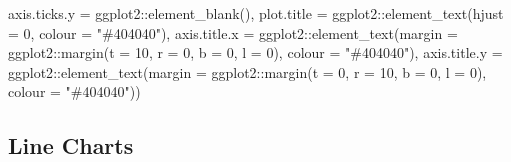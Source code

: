 \documentclass[
]{book}
\newenvironment{Shaded}{\begin{snugshade}}{\end{snugshade}}
\newcommand{\AttributeTok}[1]{\textcolor[rgb]{0.77,0.63,0.00}{#1}}
\newcommand{\DecValTok}[1]{\textcolor[rgb]{0.00,0.00,0.81}{#1}}
\newcommand{\FunctionTok}[1]{\textcolor[rgb]{0.00,0.00,0.00}{#1}}
\newcommand{\NormalTok}[1]{#1}
\newcommand{\SpecialCharTok}[1]{\textcolor[rgb]{0.00,0.00,0.00}{#1}}
\newcommand{\StringTok}[1]{\textcolor[rgb]{0.31,0.60,0.02}{#1}}
\begin{document}
\begin{Shaded}
\begin{Highlighting}[]
               \AttributeTok{axis.ticks.y =}\NormalTok{ ggplot2}\SpecialCharTok{::}\FunctionTok{element\_blank}\NormalTok{(),}
               \AttributeTok{plot.title =}\NormalTok{ ggplot2}\SpecialCharTok{::}\FunctionTok{element\_text}\NormalTok{(}\AttributeTok{hjust =} \DecValTok{0}\NormalTok{, }\AttributeTok{colour =} \StringTok{"\#404040"}\NormalTok{),}
               \AttributeTok{axis.title.x =}\NormalTok{ ggplot2}\SpecialCharTok{::}\FunctionTok{element\_text}\NormalTok{(}\AttributeTok{margin =}\NormalTok{ ggplot2}\SpecialCharTok{::}\FunctionTok{margin}\NormalTok{(}\AttributeTok{t =} \DecValTok{10}\NormalTok{, }\AttributeTok{r =} \DecValTok{0}\NormalTok{, }\AttributeTok{b =} \DecValTok{0}\NormalTok{, }\AttributeTok{l =} \DecValTok{0}\NormalTok{), }\AttributeTok{colour =} \StringTok{"\#404040"}\NormalTok{),}
               \AttributeTok{axis.title.y =}\NormalTok{ ggplot2}\SpecialCharTok{::}\FunctionTok{element\_text}\NormalTok{(}\AttributeTok{margin =}\NormalTok{ ggplot2}\SpecialCharTok{::}\FunctionTok{margin}\NormalTok{(}\AttributeTok{t =} \DecValTok{0}\NormalTok{, }\AttributeTok{r =} \DecValTok{10}\NormalTok{, }\AttributeTok{b =} \DecValTok{0}\NormalTok{, }\AttributeTok{l =} \DecValTok{0}\NormalTok{), }\AttributeTok{colour =} \StringTok{"\#404040"}\NormalTok{))}
\end{Highlighting}
\end{Shaded}

\hypertarget{line-charts}{%
\subsection{Line Charts}\label{line-charts}}
\end{document}
